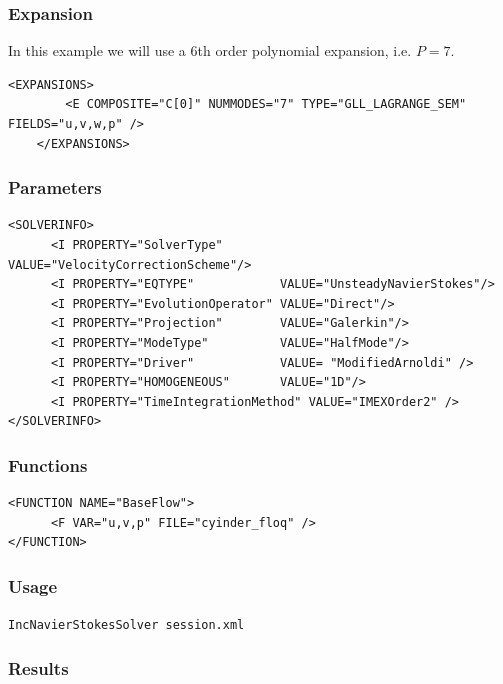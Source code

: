 \subsubsection{Expansion}

In this example we will use a 6th order polynomial expansion, i.e. $P=7$.

 \begin{lstlisting}[style=XMLStyle]  
<EXPANSIONS>
        <E COMPOSITE="C[0]" NUMMODES="7" TYPE="GLL_LAGRANGE_SEM" FIELDS="u,v,w,p" />
    </EXPANSIONS> 
                                            \end{lstlisting}
                                            
                                            
\subsubsection{Parameters}

 \begin{lstlisting}[style=XMLStyle]  
<SOLVERINFO>
      <I PROPERTY="SolverType"        VALUE="VelocityCorrectionScheme"/>
      <I PROPERTY="EQTYPE"            VALUE="UnsteadyNavierStokes"/>
      <I PROPERTY="EvolutionOperator" VALUE="Direct"/>
      <I PROPERTY="Projection"        VALUE="Galerkin"/>
      <I PROPERTY="ModeType"          VALUE="HalfMode"/>
      <I PROPERTY="Driver"            VALUE= "ModifiedArnoldi" />
      <I PROPERTY="HOMOGENEOUS"       VALUE="1D"/>
      <I PROPERTY="TimeIntegrationMethod" VALUE="IMEXOrder2" />  
</SOLVERINFO>
                                            \end{lstlisting}


\subsubsection{Functions}

 \begin{lstlisting}[style=XMLStyle]  
<FUNCTION NAME="BaseFlow">
      <F VAR="u,v,p" FILE="cyinder_floq" />
</FUNCTION>
                                            \end{lstlisting}


  \subsubsection{Usage}
  
\texttt{IncNavierStokesSolver session.xml}

\subsubsection{Results}

